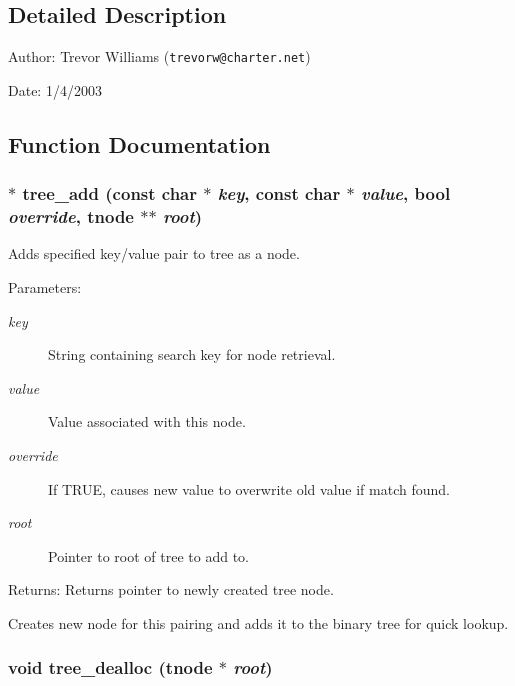 \subsection{Detailed Description}
\begin{Desc}
\item[Author:]Trevor Williams ({\tt trevorw@charter.net}) \end{Desc}
\begin{Desc}
\item[Date:]1/4/2003\end{Desc}


\subsection{Function Documentation}
\subsubsection{$\ast$ tree\_\-add (const char $\ast$ {\em key}, const char $\ast$ {\em value}, {\bf bool} {\em override}, {\bf tnode} $\ast$$\ast$ {\em root})}\label{tree_8c_a0}


Adds specified key/value pair to tree as a node. 

\begin{Desc}
\item[Parameters:]
\begin{description}
\item[{\em key}]String containing search key for node retrieval. \item[{\em value}]Value associated with this node. \item[{\em override}]If TRUE, causes new value to overwrite old value if match found. \item[{\em root}]Pointer to root of tree to add to.\end{description}
\end{Desc}
\begin{Desc}
\item[Returns:]Returns pointer to newly created tree node.\end{Desc}
Creates new node for this pairing and adds it to the binary tree for quick lookup. 
\subsubsection{\setlength{\rightskip}{0pt plus 5cm}void tree\_\-dealloc ({\bf tnode} $\ast$ {\em root})}\label{tree_8c_a3}


